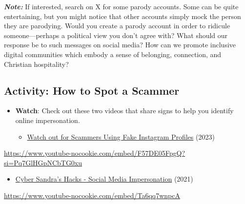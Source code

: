 \documentclass[
  letterpaper,
  DIV=11,
  numbers=noendperiod]{scrreprt}
\providecommand{\tightlist}{%
  \setlength{\itemsep}{0pt}\setlength{\parskip}{0pt}}\usepackage{longtable,booktabs,array}
\begin{document}
\begin{tcolorbox}[enhanced jigsaw, toprule=.15mm, colback=white, colframe=quarto-callout-note-color-frame, arc=.35mm, opacityback=0, breakable, rightrule=.15mm, bottomrule=.15mm, leftrule=.75mm, left=2mm]

\textbf{\emph{Note:}} If interested, search on X for some parody
accounts. Some can be quite entertaining, but you might notice that
other accounts simply mock the person they are parodying. Would you
create a parody account in order to ridicule someone---perhaps a
political view you don't agree with? What should our response be to such
messages on social media? How can we promote inclusive digital
communities which embody a sense of belonging, connection, and Christian
hospitality?

\end{tcolorbox}

\subsection{Activity: How to Spot a
Scammer}\label{activity-how-to-spot-a-scammer}

\begin{tcolorbox}[enhanced jigsaw, toprule=.15mm, colback=white, colframe=quarto-callout-note-color-frame, bottomtitle=1mm, leftrule=.75mm, coltitle=black, titlerule=0mm, rightrule=.15mm, colbacktitle=quarto-callout-note-color!10!white, left=2mm, title={Learning Activity}, opacitybacktitle=0.6, opacityback=0, breakable, toptitle=1mm, arc=.35mm, bottomrule=.15mm]

\begin{itemize}
\tightlist
\item
  \textbf{Watch}: Check out these two videos that share signs to help
  you identify online impersonation.

  \begin{itemize}
  \tightlist
  \item
    \href{https://www.youtube.com/watch?v=F57DE05FpgQ}{Watch out for
    Scammers Using Fake Instagram Profiles} (2023)
  \end{itemize}
\end{itemize}

\url{https://www.youtube-nocookie.com/embed/F57DE05FpgQ?si=Pq7GlHGpNCbTG0xu}

\begin{itemize}
\tightlist
\item
  \href{https://www.youtube.com/watch?v=Ta6qq7wnpcA}{Cyber Sandra's
  Hacks - Social Media Impersonation} (2021)
\end{itemize}

\url{https://www.youtube-nocookie.com/embed/Ta6qq7wnpcA}

\end{tcolorbox}
\end{document}
